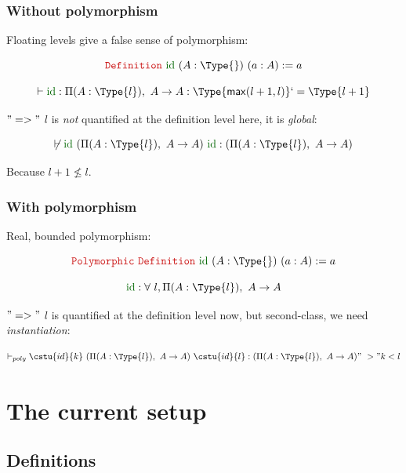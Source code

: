 \begin{frame}
  \frametitle{Without polymorphism}

  Floating levels give a false sense of polymorphism:

  \[\kw{Definition}~\cst{id}~(A : \Type{})~(a : A) := a\]

  \[\vdash \cst{id} : \Pi (A : \Type{l}),~A \rightarrow A :
  \Type{\max(l+1,l)} `= \Type{l+1} \]

  $"=>"$ $l$ is \emph{not} quantified at the definition level here, it is \emph{global}: 

  \[\not\vdash \cst{id}~(\Pi (A : \Type{l}),~A \rightarrow A)~\cst{id} : (\Pi (A :
  \Type{l}),~A \rightarrow A)\]

  Because $l+1 \not\le l$.

\end{frame}


\begin{frame}
  \frametitle{With polymorphism}

  Real, bounded polymorphism:

  \[\kw{Polymorphic}~\kw{Definition}~\cst{id}~(A : \Type{})~(a : A) := a\]

  \[\cst{id} : \forall~l, \Pi (A : \Type{l}),~A \rightarrow A\]

  $"=>"$ $l$ is quantified at the definition level now, but second-class, we need
  \emph{instantiation}:

  \[\vdash_{poly} \cstu{id}{k}~(\Pi (A : \Type{l}),~A \rightarrow A)~\cstu{id}{l} : (\Pi (A :
  \Type{l}),~A \rightarrow A) "~>" k < l\]
  
\end{frame}

\section{The current setup}


\subsection{Definitions}

